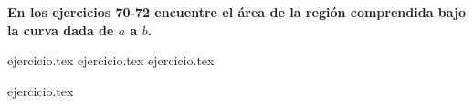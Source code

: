 \vspace{0.5cm}
\noindent\textbf{En los ejercicios 70-72 encuentre el área de la región comprendida bajo la curva dada de $a$ a $b$.}
\begin{enumerate}
    \setcounter{enumi}{69}
    {ejercicio.tex}
{ejercicio.tex}
{ejercicio.tex}
\end{enumerate}

\vspace{0.5cm}
\begin{enumerate}
    \setcounter{enumi}{72}
    {ejercicio.tex}
\end{enumerate}
